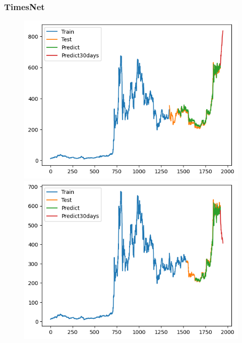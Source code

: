 \documentclass[conference]{IEEEtran}
\begin{document}
\subsubsection{TimesNet}
	        \begin{figure}[H]
			\centering
			\begin{minipage}{0.15\textwidth}
				\centering
				\includegraphics[width=1\textwidth]{Figure/TimesNet_BNB_73.png}
			\end{minipage}
			\hfill
			\begin{minipage}{0.15\textwidth}
				\centering
				\includegraphics[width=1\textwidth]{Figure/TimesNet_BNB_82.png}
			\end{minipage}
			\hfill
			\begin{minipage}{0.15\textwidth}

\end{minipage}
\end{figure}
\end{document}
